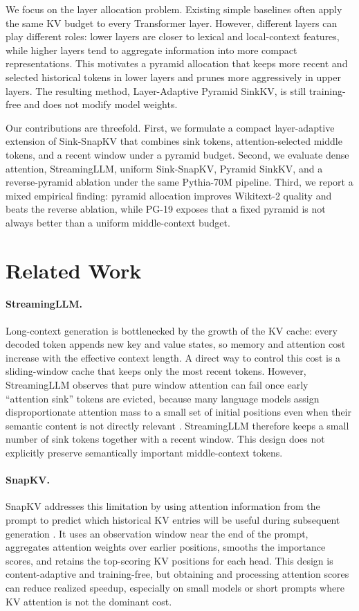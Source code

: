 \documentclass{article}
\begin{document}
We focus on the layer allocation problem. Existing simple baselines often apply
the same KV budget to every Transformer layer. However, different layers can
play different roles: lower layers are closer to lexical and local-context
features, while higher layers tend to aggregate information into more compact
representations. This motivates a pyramid allocation that keeps more recent and
selected historical tokens in lower layers and prunes more aggressively in upper
layers. The resulting method, Layer-Adaptive Pyramid SinkKV, is still
training-free and does not modify model weights.

Our contributions are threefold. First, we formulate a compact layer-adaptive
extension of Sink-SnapKV that combines sink tokens, attention-selected middle
tokens, and a recent window under a pyramid budget. Second, we evaluate dense
attention, StreamingLLM, uniform Sink-SnapKV, Pyramid SinkKV, and a
reverse-pyramid ablation under the same Pythia-70M pipeline. Third, we report a
mixed empirical finding: pyramid allocation improves Wikitext-2 quality and
beats the reverse ablation, while PG-19 exposes that a fixed pyramid is not
always better than a uniform middle-context budget.

\section{Related Work}
\label{sec:related-work}

\paragraph{StreamingLLM.}
Long-context generation is bottlenecked by the growth of the KV cache: every
decoded token appends new key and value states, so memory and attention cost
increase with the effective context length. A direct way to control this cost is
a sliding-window cache that keeps only the most recent tokens. However,
StreamingLLM observes that pure window attention can fail once early
``attention sink'' tokens are evicted, because many language models assign
disproportionate attention mass to a small set of initial positions even when
their semantic content is not directly relevant \citep{xiao2023streamingllm}.
StreamingLLM therefore keeps a small number of sink tokens together with a recent
window. This design does not explicitly preserve semantically important
middle-context tokens.

\paragraph{SnapKV.}
SnapKV addresses this limitation by using attention information from the prompt
to predict which historical KV entries will be useful during subsequent
generation \citep{li2024snapkv}. It uses an observation window near the end of
the prompt, aggregates attention weights over earlier positions, smooths the
importance scores, and retains the top-scoring KV positions for each head. This
design is content-adaptive and training-free, but obtaining and processing
attention scores can reduce realized speedup, especially on small models or
short prompts where KV attention is not the dominant cost.
\end{document}
